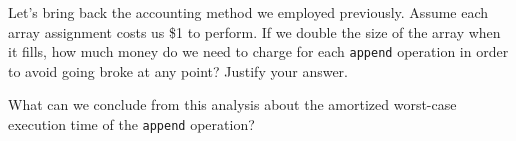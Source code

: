 \documentclass{tufte-handout}
\begin{document}
\begin{questions}
\item Let's bring back the accounting method we employed previously. Assume each array assignment costs us \$1 to perform. If we double the size of the array when it fills, how much money do we need to charge for each \verb|append| operation in order to avoid going broke at any point? Justify your answer.

\item What can we conclude from this analysis about the amortized worst-case execution time of the \verb|append| operation?

\end{questions}
\end{document}
